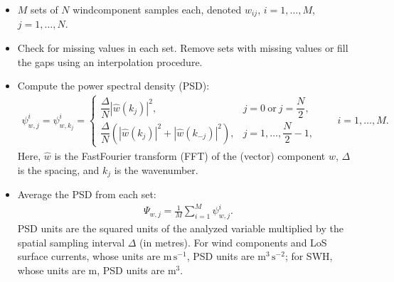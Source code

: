 \documentclass[a4paper,10pt,english]{sphinxmanual}
\begin{document}
\sphinxAtStartPar
{}
\begin{itemize}
\item {} 
\sphinxAtStartPar
\(M\) sets of \(N\) wind\sphinxhyphen{}component samples each, denoted
\(w_{ij}\), \(i=1,\ldots,M\), \(j=1,\ldots,N\).

\end{itemize}

\sphinxAtStartPar
{}
\begin{itemize}
\item {} 
\sphinxAtStartPar
Check for missing values in each set. Remove sets with missing values or fill
the gaps using an interpolation procedure.

\item {} 
\sphinxAtStartPar
Compute the power spectral density (PSD):
\begin{equation}\label{equation:alg-02-validation:eq-cvtdd-spectral-density}
\begin{split}\psi^{i}_{w,j}=\psi^{i}_{w,k_j}=
\begin{cases}
\dfrac{\Delta}{N}\left|\hat{w}(k_j)\right|^2,
  & j=0\ \text{or}\ j=\dfrac{N}{2},\\[4pt]
\dfrac{\Delta}{N}\left(
  \left|\hat{w}(k_j)\right|^2+
  \left|\hat{w}(k_{-j})\right|^2
\right),
  & j=1,\ldots,\dfrac{N}{2}-1,
\end{cases}
\qquad i=1,\ldots,M .\end{split}
\end{equation}
\sphinxAtStartPar
Here, \(\hat{w}\) is the Fast\sphinxhyphen{}Fourier transform (FFT) of the (vector)
component \(w\), \(\Delta\) is the spacing, and \(k_j\) is the
wavenumber.

\item {} 
\sphinxAtStartPar
Average the PSD from each set:
\begin{equation}\label{equation:alg-02-validation:eq-cvtdd-average-spectral-density}
\begin{split}\Psi_{w,j}=\frac{1}{M}\sum_{i=1}^{M}\psi^{i}_{w,j} .\end{split}
\end{equation}
\sphinxAtStartPar
PSD units are the squared units of the analyzed variable multiplied by the
spatial sampling interval \(\Delta\) (in metres). For wind components
and LoS surface currents, whose units are \(\mathrm{m\,s^{-1}}\), PSD
units are \(\mathrm{m^3\,s^{-2}}\); for SWH, whose units are
\(\mathrm{m}\), PSD units are \(\mathrm{m^3}\).

\end{itemize}
\end{document}
